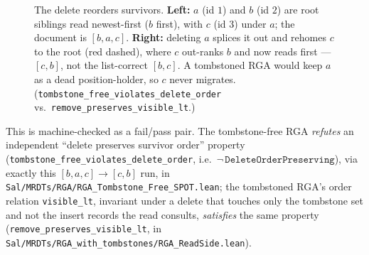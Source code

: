 \documentclass[11pt]{article}
\newcommand{\Del}{\mathsf{Del}}
\begin{document}
\begin{figure}[h]
\centering
{}
\caption{The delete reorders survivors. \textbf{Left:} $a$ (id $1$) and $b$ (id
$2$) are root siblings read newest-first ($b$ first), with $c$ (id $3$) under $a$;
the document is $[b,a,c]$. \textbf{Right:} deleting $a$ splices it out and rehomes
$c$ to the root (red dashed), where $c$ out-ranks $b$ and now reads first ---
$[c,b]$, not the list-correct $[b,c]$. A tombstoned RGA would keep $a$ as a dead
position-holder, so $c$ never migrates.
(\texttt{tombstone\_free\_violates\_delete\_order} vs.\
\texttt{remove\_preserves\_visible\_lt}.)}
\label{fig:reorder}
\end{figure}

This is machine-checked as a fail/pass pair. The tombstone-free RGA
\emph{refutes} an independent ``delete preserves survivor order'' property
(\texttt{tombstone\_free\_violates\_delete\_order}, i.e.\
$\neg\,\texttt{DeleteOrderPreserving}$), via exactly this $[b,a,c]\to[c,b]$ run,
in \texttt{Sal/MRDTs/RGA/RGA\_Tombstone\_Free\_SPOT.lean}; the tombstoned RGA's
order relation \texttt{visible\_lt}, invariant under a delete that touches only the
tombstone set and not the insert records the read consults, \emph{satisfies} the
same property (\texttt{remove\_preserves\_visible\_lt}, in
\texttt{Sal/MRDTs/RGA\_with\_tombstones/RGA\_ReadSide.lean}).
\end{document}
